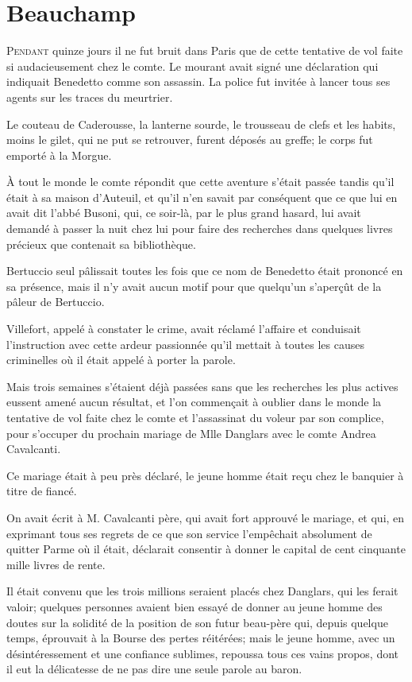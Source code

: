 \chapter{Beauchamp}

\lettrine{P}{endant} quinze jours il ne fut bruit dans Paris que de cette tentative de vol faite si audacieusement chez le comte. Le mourant avait signé une déclaration qui indiquait Benedetto comme son assassin. La police fut invitée à lancer tous ses agents sur les traces du meurtrier. 

Le couteau de Caderousse, la lanterne sourde, le trousseau de clefs et les habits, moins le gilet, qui ne put se retrouver, furent déposés au greffe; le corps fut emporté à la Morgue. 

À tout le monde le comte répondit que cette aventure s'était passée tandis qu'il était à sa maison d'Auteuil, et qu'il n'en savait par conséquent que ce que lui en avait dit l'abbé Busoni, qui, ce soir-là, par le plus grand hasard, lui avait demandé à passer la nuit chez lui pour faire des recherches dans quelques livres précieux que contenait sa bibliothèque. 

Bertuccio seul pâlissait toutes les fois que ce nom de Benedetto était prononcé en sa présence, mais il n'y avait aucun motif pour que quelqu'un s'aperçût de la pâleur de Bertuccio. 

Villefort, appelé à constater le crime, avait réclamé l'affaire et conduisait l'instruction avec cette ardeur passionnée qu'il mettait à toutes les causes criminelles où il était appelé à porter la parole. 

Mais trois semaines s'étaient déjà passées sans que les recherches les plus actives eussent amené aucun résultat, et l'on commençait à oublier dans le monde la tentative de vol faite chez le comte et l'assassinat du voleur par son complice, pour s'occuper du prochain mariage de Mlle Danglars avec le comte Andrea Cavalcanti. 

Ce mariage était à peu près déclaré, le jeune homme était reçu chez le banquier à titre de fiancé. 

On avait écrit à M. Cavalcanti père, qui avait fort approuvé le mariage, et qui, en exprimant tous ses regrets de ce que son service l'empêchait absolument de quitter Parme où il était, déclarait consentir à donner le capital de cent cinquante mille livres de rente. 

Il était convenu que les trois millions seraient placés chez Danglars, qui les ferait valoir; quelques personnes avaient bien essayé de donner au jeune homme des doutes sur la solidité de la position de son futur beau-père qui, depuis quelque temps, éprouvait à la Bourse des pertes réitérées; mais le jeune homme, avec un désintéressement et une confiance sublimes, repoussa tous ces vains propos, dont il eut la délicatesse de ne pas dire une seule parole au baron. 

